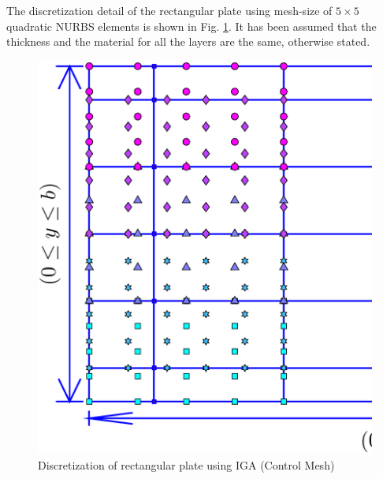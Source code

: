 \documentclass[3p,preprint,12pt]{elsarticle}
\begin{document}

The discretization detail of the rectangular plate using mesh-size of $5\times5$ quadratic NURBS elements is shown in Fig. \ref{Figure:Discretization}.  It has been assumed that the thickness and the material for all the layers are the same, otherwise stated.

\begin{figure}
	\graphicspath{{./All_Images/}}
	\centering
	\includegraphics[width=\linewidth]{Control_Mesh}
	\caption{Discretization of rectangular plate using IGA (Control Mesh)}
	\label{Figure:Discretization}
\end{figure}
\end{document}
